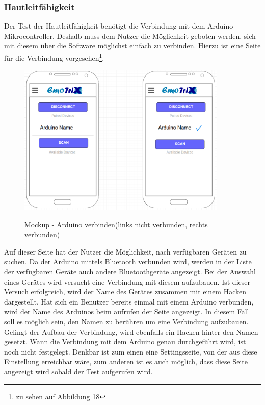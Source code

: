 \subsubsection{Hautleitfähigkeit}
Der Test der Hautleitfähigkeit benötigt die Verbindung mit dem Arduino-Mikrocontroller. Deshalb muss dem Nutzer die Möglichkeit geboten werden, sich mit diesem über die Software möglichst einfach zu verbinden. Hierzu ist eine Seite für die Verbindung vorgesehen\footnote{zu sehen auf Abbildung 18}. 
\begin{figure}[h]
	\centering
	\includegraphics[width=10cm]{Bilder/Mockup-Arduino-Connection.png}
	\label{img:Mockup-Arduino-Connection}
	\caption[Mockup - Arduino verbinden(links nicht verbunden, rechts verbunden)]{Mockup - Arduino verbinden(links nicht verbunden, rechts verbunden)}
\end{figure}%
Auf dieser Seite hat der Nutzer die Möglichkeit, nach verfügbaren Geräten zu suchen. Da der Arduino mittels Bluetooth verbunden wird, werden in der Liste der verfügbaren Geräte auch andere Bluetoothgeräte angezeigt. Bei der Auswahl eines Gerätes wird versucht eine Verbindung mit diesem aufzubauen. Ist dieser Versuch erfolgreich, wird der Name des Gerätes zusammen mit einem Hacken dargestellt. Hat sich ein Benutzer bereits einmal mit einem Arduino verbunden, wird der Name des Arduinos beim aufrufen der Seite angezeigt. In diesem Fall soll es möglich sein, den Namen zu berühren um eine Verbindung aufzubauen. Gelingt der Aufbau der Verbindung, wird ebenfalls ein Hacken hinter den Namen gesetzt.\newline
Wann die Verbindung mit dem Arduino genau durchgeführt wird, ist noch nicht festgelegt. Denkbar ist zum einen eine Settingsseite, von der aus diese Einstellung erreichbar wäre, zum anderen ist es auch möglich, dass diese Seite angezeigt wird sobald der Test aufgerufen wird.\newline
